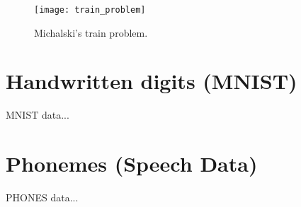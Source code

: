 \begin{figure}[H]
\centering
\texttt{[image: train\_problem]}
\caption{Michalski's train problem.}
\label{fig:examples:dataset_train}
\end{figure}

\section{Handwritten digits (MNIST)} \label{sec:dataset_mnist}
MNIST data... \citep{online:mnist}

\section{Phonemes (Speech Data)} \label{sec:dataset_phonemes}
PHONES data...
